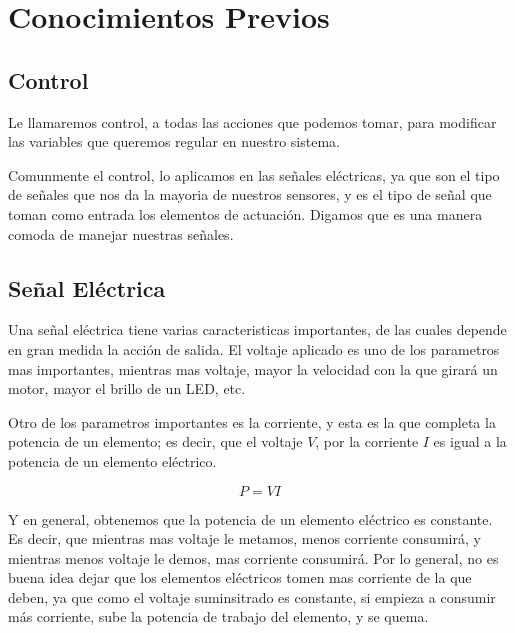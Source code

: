 
\section{Conocimientos Previos}


	\subsection{Control}

		Le llamaremos control, a todas las acciones que podemos tomar, para modificar las variables que queremos regular en nuestro sistema.

		Comunmente el control, lo aplicamos en las señales eléctricas, ya que son el tipo de señales que nos da la mayoria de nuestros sensores, y es el tipo de señal que toman como entrada los elementos de actuación. Digamos que es una manera comoda de manejar nuestras señales.


	\subsection{Señal Eléctrica}

		Una señal eléctrica tiene varias caracteristicas importantes, de las cuales depende en gran medida la acción de salida. El voltaje aplicado es uno de los parametros mas importantes, mientras mas voltaje, mayor la velocidad con la que girará un motor, mayor el brillo de un LED, etc.

		Otro de los parametros importantes es la corriente, y esta es la que completa la potencia de un elemento; es decir, que el voltaje $V$, por la corriente $I$ es igual a la potencia de un elemento eléctrico.

		\begin{equation}
			P = V I
		\end{equation}

		Y en general, obtenemos que la potencia de un elemento eléctrico es constante. Es decir, que mientras mas voltaje le metamos, menos corriente consumirá, y mientras menos voltaje le demos, mas corriente consumirá. Por lo general, no es buena idea dejar que los elementos eléctricos tomen mas corriente de la que deben, ya que como el voltaje suminsitrado es constante, si empieza a consumir más corriente, sube la potencia de trabajo del elemento, y se quema.

